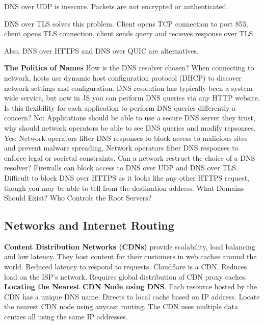 \documentclass{article}
\begin{document}
DNS over UDP is insecure. Packets are not encrypted or authenticated.

DNS over TLS solves this problem. Client opens TCP connection to port 853, client opens TLS connection,
client sends query and recieves response over TLS\@.

Also, DNS over HTTPS and DNS over QUIC are alternatives.

\textbf{The Politics of Names}
How is the DNS resolver chosen? When connecting to network, hosts use dynamic host configuration protocol (DHCP)
to discover network settings and configuration.
DNS resolution has typically been a system-wide service, but now in JS you can perform DNS queries via any HTTP website.
Is this flexibility for each application to perform DNS queries differently a concern?
No: Applications should be able to use a secure DNS server they trust, why should network operators be able to see DNS queries and modify repsonses.
Yes: Network operators filter DNS responses to block access to malicious sites and prevent malware spreading,
Network operators filter DNS responses to enforce legal or societal constraints.
Can a network restruct the choice of a DNS resolver?
Firewalls can block access to DNS over UDP and DNS over TLS\@.
Difficult to block DNS over HTTPS as it looks like any other HTTPS request, though you may be able to tell from the destination address.
What Domains Should Exist?
Who Controls the Root Servers?



\subsection*{Networks and Internet Routing}

\textbf{Content Distribution Networks (CDNs)} provide scalability, load balancing and low latency.
They host content for their customers in web caches around the world.
Reduced latency to respond to requests.
Cloudflare is a CDN\@.
Reduces load on the ISP's network.
Requires global distribution of CDN proxy caches.
\textbf{Locating the Nearest CDN Node using DNS}.
Each resource hosted by the CDN has a unique DNS name.
Directs to local cache based on IP address.
Locate the nearest CDN node using anycast routing.
The CDN uses multiple data centres \- all using the same IP addresses.
\end{document}
